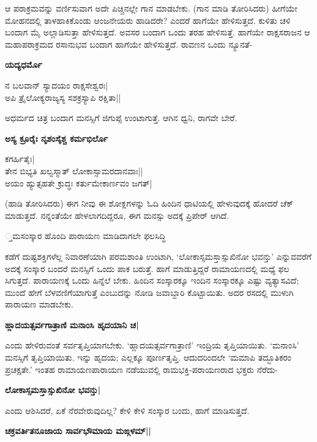 ಆ ಪರಾಕ್ರಮವನ್ನು ವರ್ಣಿಸುವಾಗ ಅದೇ ಪಿಚ್ಚಿನಲ್ಲೇ ಗಾನ ಮಾಡಬೇಕು. (ಗಾನ ಮಾಡಿ ತೋರಿಸಿದರು) ಹೀಗೆಯೇ ಮೋಹನದಲ್ಲಿ ತಾಳಹಾಕಿಕೊಂಡು ಆಂಜನೇಯರು ಹಾಡಿದರೇ? ಎಂದರೆ ಹಾಗೆಯೇ ಹೇಳಿಸುತ್ತದೆ. ಕುಳಿತು ಚಳಿ ಬಂದಾಗ ಮೈ ಅಲ್ಲಾಡಿಸುತ್ತಾ ಹೇಳಿಸುತ್ತದೆ. ಅವಸರ ಬಂದಾಗ ಒಂದು ತರಹ ಹೇಳಿಸುತ್ತೆ. ಹಾಗೆಯೇ ರಾಕ್ಷಸರಾಜನ ಆ ಮಹಾಪರಾಕ್ರಮದ ರಸಾನುಭವ ಬಂದಾಗ ಹಾಗೆಯೇ ಹೇಳಿಸುತ್ತದೆ. ರಾವಣನ ಒಂದು ನ್ಯೂನತೆ- 


\begin{center} 

{\bf ಯದ್ಯಧರ್ಮೊ

ನ ಬಲವಾನ್‍ ಸ್ಯಾದಯಂ ರಾಕ್ಷಸೇಶ್ವರಃ|\\ 

ಅಪಿ ತ್ರೈಲೋಕ್ಯರಾಜ್ಯಸ್ಯ ಸಶಕ್ರಸ್ಯಾಪಿ ರಕ್ಷಿತಾ||} 

\end{center} 


ಅಧರ್ಮದ ಚಿತ್ರ ಬಂದಾಗ ಮನಸ್ಸಿಗೆ ಜಿಗುಪ್ಸೆ ಉಂಟಾಗುತ್ತೆ. ಆಗಿನ ಧ್ವನಿ, ರಾಗವೇ ಬೇರೆ. 


\begin{center} 

{\bf ಅಸ್ಯ ಕ್ರೂರೈಃ ನೃಶಂಸೈಶ್ಚ ಕರ್ಮಭಿರ್ಲೊ

ಕಗರ್ಹಿತೈಃ|\\ 

ತೇನ ಬಿಭ್ಯತಿ ಖಲ್ವಸ್ಮಾತ್‍ ಲೋಕಾಸ್ಸಾಮರದಾನವಾಃ||\\ 

ಅಯಂ ಹ್ಯುತ್ಸಹತೇ ಕ್ರುದ್ಧಃ ಕರ್ತುಮೇಕಾರ್ಣವಂ ಜಗತ್‍|} 

\end{center} 


(ಹಾಡಿ ತೋರಿಸಿದರು) ಈಗ ನೀವು ಈ ಶೋಕ್ಲಗಳನ್ನು ಓದಿ ಹಿಂದಿನ ಧಾಟಿಯಲ್ಲಿ ಹೇಳುವುದಕ್ಕೆ ಹೋದರೆ ಚೆಕ್‍ ಮಾಡುತ್ತದೆ. ನನ್ನಂತೆಯೇ ಹೇಳಲಾಗದಿದ್ದರೂ, ಈಗ ಮನಸ್ಸು ಅದಕ್ಕೆ ಪ್ರಿಪೇರ್‍ ಆಗಿದೆ. 


\large{್ತಮಸಂಸ್ಕಾರ ಹೊಂದಿ ಪಾರಾಯಣ ಮಾಡಿದಾಗಲೇ ಫಲಸಿದ್ಧಿ} 


ಕಡೆಗೆ ದುಷ್ಟಶಕ್ತಿಗಳೆಲ್ಲ ನಿವಾರಣೆಯಾಗಿ ಪರಮಶಾಂತಿ ಉಂಟಾಗಿ, `ಲೋಕಾಸ್ಸಮಸ್ತಾಸ್ಸುಖಿನೋ ಭವನ್ತು' ಎನ್ನುವವರೆಗೆ ಅದಕ್ಕೆ ಸಂಸ್ಕಾರ ಬಂದರೆ ಮನಸ್ಸಿಗೆ ಒಂದು ಪಾಕ ಬರುತ್ತೆ. ಹಾಗೆ ಮಾಡುತ್ತಿದ್ದರೆ ರಾಮಾಯಣದಲ್ಲಿ ಮಧ್ಯೆ ಫಲ ಸಿಗುತ್ತದೆ. ಪಾರಾಯಣಕ್ಕೆ ಒಂದು ಹಿನ್ನೆಲೆ ಬೇಕು. ಹಿಂದಿನ ಸಂಸ್ಕಾರಕ್ಕೂ ಇಂದಿನ ಸಂಸ್ಕಾರಕ್ಕೂ ಎಷ್ಟು ವ್ಯತ್ಯಾಸವಿದೆ; ಮುಂದೆ ಹೇಗೆ ಬೆಳವಣಿಗೆಯಾಗುತ್ತೆ ಎಂಬುದನ್ನು ನೋಡಿ ಜವಾಬ್ದಾರಿ ಕೊಟ್ಟಾಯಿತು. ಅದರ ರಸದಲ್ಲಿ ಮುಳುಗಿ ಪಾರಾಯಣ ಮಾಡಬೇಕು. 


\begin{center} 

{\bf ಹ್ಲಾದಯತ್ಸರ್ವಗಾತ್ರಾಣಿ ಮನಾಂಸಿ ಹೃದಯಾನಿ ಚ|} 

\end{center} 


ಎಂದು ಹೇಳಿರುವಂತೆ ಸರ್ವತೃಪ್ತಿಯಾಗಬೇಕು. `ಹ್ಲಾದಯತ್ಸರ್ವಗಾತ್ರಾಣಿ' ಇಂದ್ರಿಯ ತೃಪ್ತಿಯಾಯಿತು. `ಮನಾಂಸಿ' ಮನಸ್ಸಿಗೆ ತೃಪ್ತಿಯಾಯಿತು. ಇನ್ನು ಹೃದಯ; ಎಲ್ಲಕ್ಕೂ ಪೂರ್ಣತೃಪ್ತಿ. ಆದುದರಿಂದಲೇ `ಮಮಾಪಿ ತದ್ಭೂತಿಕರಂ ಪ್ರಚಕ್ಷತೇ.' ಇಂತಹ ರಾಮಾಯಣಪಾರಾಯಣ ನಡೆಯುವಲ್ಲಿ ರಾಮಭಕ್ತಿ-ಪರಾಯಣರಾದ ಭಕ್ತರು ನೆರೆದು- 


\begin{center} 

{\bf ಲೋಕಾಸ್ಸಮಸ್ತಾಸ್ಸುಖಿನೋ ಭವನ್ತು|} 

\end{center} 


ಎಂದು ಆಶಿಸಿದರೆ, ಏಕೆ ನೆರವೇರುವುದಿಲ್ಲ? ಕೇಳಿ ಕೇಳಿ ಸಂಸ್ಕಾರ ಬಂದು, ಹಾಗೆ ಮಾಡಿಸುತ್ತದೆ. 


\begin{center} 

{\bf ಚಕ್ರವರ್ತಿತನೂಜಾಯ ಸಾರ್ವಭೌಮಾಯ ಮಙ್ಗಳಮ್‍||} 

\end{center} 

